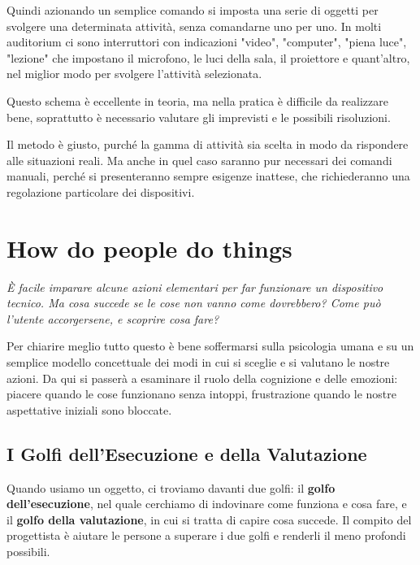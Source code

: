 \documentclass[a4paper,11pt,oneside]{book}
\begin{document}
Quindi azionando un semplice comando si imposta una serie di oggetti per svolgere una determinata attività, senza comandarne uno per uno. In molti auditorium ci sono interruttori con indicazioni "video", "computer", "piena luce", "lezione" che impostano il microfono, le luci della sala, il proiettore e quant'altro, nel miglior modo per svolgere l'attività selezionata.

Questo schema è eccellente in teoria, ma nella pratica è difficile da realizzare bene, soprattutto è necessario valutare gli imprevisti e le possibili risoluzioni.

Il metodo è giusto, purché la gamma di attività sia scelta in modo da rispondere alle situazioni reali. Ma anche in quel caso saranno pur necessari dei comandi manuali, perché si presenteranno sempre esigenze inattese, che richiederanno una regolazione particolare dei dispositivi.


\chapter{How do people do things}
\begin{flushleft}
	\textit{
		È facile imparare alcune azioni elementari per far funzionare un dispositivo tecnico. Ma cosa succede se le cose non vanno come dovrebbero? Come può l'utente accorgersene, e scoprire cosa fare? }
\end{flushleft}

Per chiarire meglio tutto questo è bene soffermarsi sulla psicologia umana e su un semplice modello concettuale dei modi in cui si sceglie e si valutano le nostre azioni. Da qui si passerà a esaminare il ruolo della cognizione e delle emozioni: piacere quando le cose funzionano senza intoppi, frustrazione quando le nostre aspettative iniziali sono bloccate.

\section{I Golfi dell'Esecuzione e della Valutazione}
Quando usiamo un oggetto, ci troviamo davanti due golfi: il \textbf{golfo dell'esecuzione}, nel quale cerchiamo di indovinare come funziona e cosa fare, e il \textbf{golfo della valutazione}, in cui si tratta di capire cosa succede. Il compito del progettista è aiutare le persone a superare i due golfi e renderli il meno profondi possibili.
\end{document}
